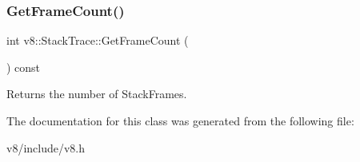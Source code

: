 \subsubsection{\texorpdfstring{Get\+Frame\+Count()}{GetFrameCount()}}
{\footnotesize\ttfamily int v8\+::\+Stack\+Trace\+::\+Get\+Frame\+Count (\begin{DoxyParamCaption}{ }\end{DoxyParamCaption}) const}

Returns the number of Stack\+Frames. 

The documentation for this class was generated from the following file\+:\begin{DoxyCompactItemize}
\item 
v8/include/v8.\+h\end{DoxyCompactItemize}

